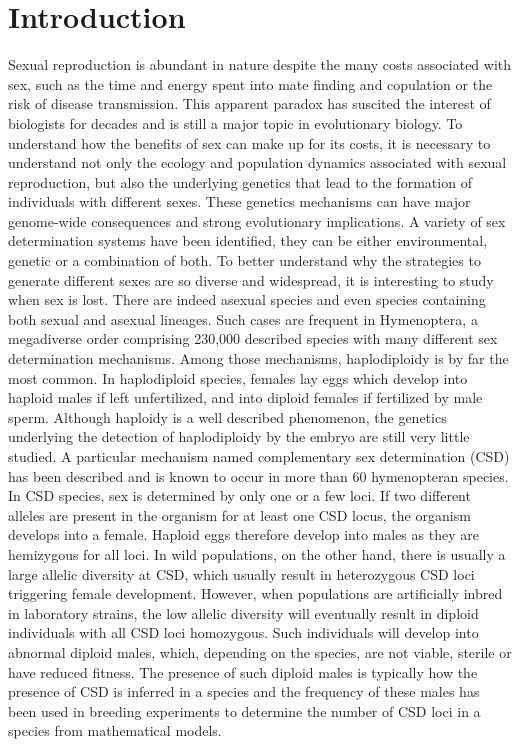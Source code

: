 \documentclass[11pt,a4paper]{report}
\begin{document}
\section*{Introduction}
Sexual reproduction is abundant in nature despite the many costs associated with sex, such as the time and energy spent into mate finding and copulation or the risk of disease transmission. This apparent paradox has suscited the interest of biologists for decades and is still a major topic in evolutionary biology. To understand how the benefits of sex can make up for its costs, it is necessary to understand not only the ecology and population dynamics associated with sexual reproduction, but also the underlying genetics that lead to the formation of individuals with different sexes. These genetics mechanisms can have major genome-wide consequences and strong evolutionary implications. A variety of sex determination systems have been identified, they can be either environmental, genetic or a combination of both. To better understand why the strategies to generate different sexes are so diverse and widespread, it is interesting to study when sex is lost. There are indeed asexual species and even species containing both sexual and asexual lineages. Such cases are frequent in Hymenoptera, a megadiverse order comprising 230,000 described species with many different sex determination mechanisms. Among those mechanisms, haplodiploidy is by far the most common. In haplodiploid species, females lay eggs which develop into haploid males if left unfertilized, and into diploid females if fertilized by male sperm. 
Although haploidy is a well described phenomenon, the genetics underlying the detection of haplodiploidy by the embryo are still very little studied. A particular mechanism named complementary sex determination (CSD) has been described and is known to occur in more than 60 hymenopteran species. In CSD species, sex is determined by only one or a few loci. If two different alleles are present in the organism for at least one CSD locus, the organism develops into a female. Haploid eggs therefore develop into males as they are hemizygous for all loci. In wild populations, on the other hand, there is usually a large allelic diversity at CSD, which usually result in heterozygous CSD loci triggering female development. However, when populations are artificially inbred in laboratory strains, the low allelic diversity will eventually result in diploid individuals with all CSD loci homozygous. Such individuals will develop into abnormal diploid males, which, depending on the species, are not viable, sterile or have reduced fitness. The presence of such diploid males is typically how the presence of CSD is inferred in a species and the frequency of these males has been used in breeding experiments to determine the number of CSD loci in a species from mathematical models.
\end{document}
